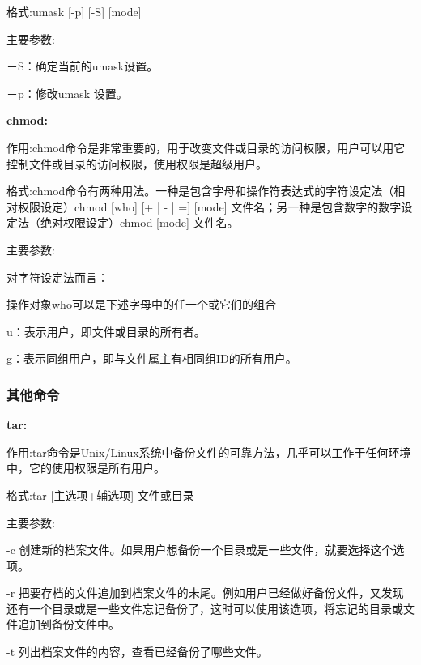 格式:umask [-p] [-S] [mode]

主要参数:

－S：确定当前的umask设置。

－p：修改umask 设置。

\textbf{chmod:}

作用:chmod命令是非常重要的，用于改变文件或目录的访问权限，用户可以用它控制文件或目录的访问权限，使用权限是超级用户。

格式:chmod命令有两种用法。一种是包含字母和操作符表达式的字符设定法（相对权限设定）chmod [who] [+ | - | =] [mode] 文件名；另一种是包含数字的数字设定法（绝对权限设定）chmod [mode] 文件名。

主要参数:

对字符设定法而言：

操作对象who可以是下述字母中的任一个或它们的组合

u：表示用户，即文件或目录的所有者。

g：表示同组用户，即与文件属主有相同组ID的所有用户。

\subsubsection{其他命令}

\textbf{tar:}

作用:tar命令是Unix/Linux系统中备份文件的可靠方法，几乎可以工作于任何环境中，它的使用权限是所有用户。

格式:tar [主选项+辅选项] 文件或目录

主要参数:

-c 创建新的档案文件。如果用户想备份一个目录或是一些文件，就要选择这个选项。

-r 把要存档的文件追加到档案文件的未尾。例如用户已经做好备份文件，又发现还有一个目录或是一些文件忘记备份了，这时可以使用该选项，将忘记的目录或文件追加到备份文件中。

-t 列出档案文件的内容，查看已经备份了哪些文件。
